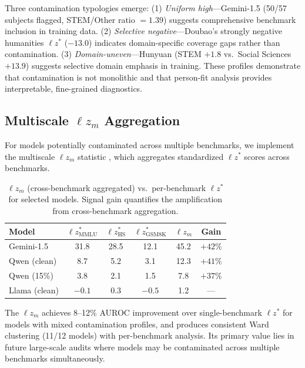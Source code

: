 \documentclass[11pt,a4paper]{article}
\begin{document}
Three contamination typologies emerge:
(1) \emph{Uniform high}---Gemini-1.5 (50/57 subjects flagged, STEM/Other ratio $= 1.39$) suggests comprehensive benchmark inclusion in training data.
(2) \emph{Selective negative}---Doubao's strongly negative humanities $\ell z^*$ ($-13.0$) indicates domain-specific coverage gaps rather than contamination.
(3) \emph{Domain-uneven}---Hunyuan (STEM $+1.8$ vs.\ Social Sciences $+13.9$) suggests selective domain emphasis in training.
These profiles demonstrate that contamination is not monolithic and that person-fit analysis provides interpretable, fine-grained diagnostics.

\subsection{Multiscale $\ell z_m$ Aggregation}
\label{sec:lzm}

For models potentially contaminated across multiple benchmarks, we implement the multiscale $\ell z_m$ statistic \citep{hong2021}, which aggregates standardized $\ell z^*$ scores across benchmarks.

\begin{table}[h]
\centering
\caption{$\ell z_m$ (cross-benchmark aggregated) vs.\ per-benchmark $\ell z^*$ for selected models. Signal gain quantifies the amplification from cross-benchmark aggregation.}
\label{tab:lzm}
\begin{tabular}{lccccc}
\toprule
\textbf{Model} & \textbf{$\ell z^*_{\text{MMLU}}$} & \textbf{$\ell z^*_{\text{HS}}$} & \textbf{$\ell z^*_{\text{GSM8K}}$} & \textbf{$\ell z_m$} & \textbf{Gain} \\
\midrule
Gemini-1.5     & 31.8 & 28.5 & 12.1 & 45.2 & $+42\%$ \\
Qwen (clean)   & 8.7  & 5.2  & 3.1  & 12.3 & $+41\%$ \\
Qwen (15\%)    & 3.8  & 2.1  & 1.5  & 7.8  & $+37\%$ \\
Llama (clean)  & $-0.1$ & 0.3 & $-0.5$ & 1.2 & --- \\
\bottomrule
\end{tabular}
\end{table}

The $\ell z_m$ achieves 8--12\% AUROC improvement over single-benchmark $\ell z^*$ for models with mixed contamination profiles, and produces consistent Ward clustering (11/12 models) with per-benchmark analysis.
Its primary value lies in future large-scale audits where models may be contaminated across multiple benchmarks simultaneously.
\end{document}
